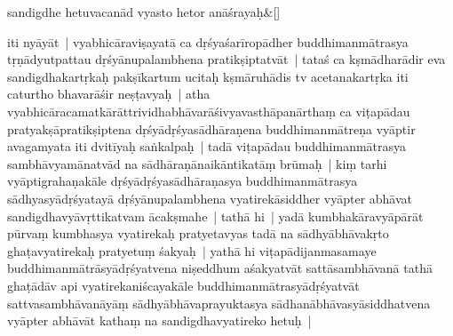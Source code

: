 \documentclass[article,12pt,a4paper]{memoir}%
\newcounter{parCount}
\begin{document}
	    
	    \stanza[\smallbreak]
	  sandigdhe hetuvacanād vyasto hetor anāśrayaḥ\&[\smallbreak]
	  
	  
	  

	  \pstart \leavevmode%
	iti nyāyāt | vyabhicāraviṣayatā ca dṛśyaśarīropādher buddhimanmātrasya tṛṇādyutpattau dṛśyānupalambhena pratikṣiptatvāt | tataś ca kṣmādharādir eva sandigdhakartṛkaḥ pakṣīkartum ucitaḥ kṣmāruhādis tv acetanakartṛka iti caturtho bhavarāśir neṣṭavyaḥ | atha vyabhicāracamat\label{ratnakīrtinibandhāvali__36r1PF7IMW2MOB8FDBO73BBUMXX}kārāttri\label{ratnakīrtinibandhāvali__36r1PF7IMW1RSAP4VW0YYBRBY6Z}vidhabhāvarāśivyavasthāpanārthaṃ ca viṭapādau pratyakṣāpratikṣiptena dṛśyādṛśyasādhāraṇena buddhimanmātreṇa vyāptir avagamyata iti dvitīyaḥ saṅkalpaḥ | tadā viṭapādau buddhimanmātrasya sambhāvyamānatvād na sādhāraṇānaikāntikatāṃ brūmaḥ | kiṃ tarhi vyāptigrahaṇakāle dṛśyādṛśyasādhāraṇasya buddhimanmātrasya sādhyasyādṛśyatayā dṛśyānupalambhena vyatirekāsiddher vyāpter abhāvat sandigdhavyāvṛttikatvam ācakṣmahe | tathā hi | yadā kumbhakāravyāpārāt pūrvaṃ kumbhasya vyatirekaḥ pratyetavyas tadā na sādhyābhāvakṛto ghaṭavyatirekaḥ pratyetuṃ śakyaḥ | yathā hi viṭapādijanmasamaye buddhimanmātrāsyādṛśyatvena niṣeddhum aśakyatvāt sattāsambhāvanā tathā ghaṭādāv api vyatirekaniścayakāle buddhimanmātrasyādṛśyatvāt sattvasambhāvanāyāṃ sādhyābhāvaprayuktasya sādhanābhāvasyāsiddhatvena vyāpter abhāvāt kathaṃ na sandigdhavyatireko hetuḥ |
	{}
	\pend%
      
\end{document}
